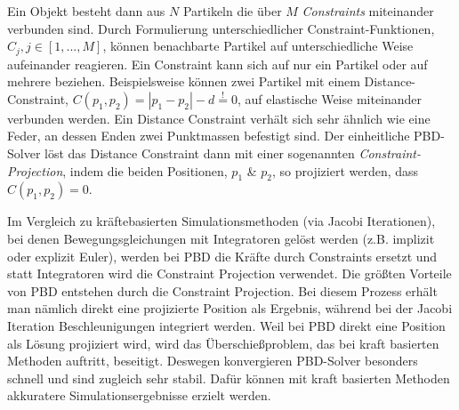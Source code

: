 Ein Objekt besteht dann aus $N$ Partikeln die über $M$ \textit{Constraints} miteinander verbunden sind. Durch Formulierung unterschiedlicher Constraint-Funktionen, $C_j, j \in [1,...,M] $, können benachbarte Partikel auf unterschiedliche Weise aufeinander reagieren. Ein Constraint kann sich auf nur ein Partikel oder auf mehrere beziehen.
Beispielsweise können zwei Partikel mit einem Distance-Constraint, $C(p_1,p_2) = |p_1-p_2|-d \stackrel{!}{=} 0$, auf elastische Weise miteinander verbunden werden. Ein Distance Constraint verhält sich sehr ähnlich wie eine Feder, an dessen Enden zwei Punktmassen befestigt sind. Der einheitliche PBD-Solver löst das Distance Constraint dann mit einer sogenannten \textit{Constraint-Projection}, indem die beiden Positionen, $p_1$ \& $p_2$, so projiziert werden, dass $C(p_1,p_2) = 0$. 

Im Vergleich zu kräftebasierten Simulationsmethoden (via Jacobi Iterationen), bei denen Bewegungsgleichungen mit Integratoren gelöst werden (z.B. implizit oder explizit Euler), werden bei PBD die Kräfte durch Constraints ersetzt und statt Integratoren wird die Constraint Projection verwendet. Die größten Vorteile von PBD entstehen durch die Constraint Projection. Bei diesem Prozess erhält man nämlich direkt eine projizierte Position als Ergebnis, während bei der Jacobi Iteration Beschleunigungen integriert werden. 
Weil bei PBD direkt eine Position als Lösung projiziert wird,
wird das Überschießproblem, das bei kraft basierten Methoden auftritt, beseitigt. Deswegen konvergieren PBD-Solver besonders schnell und sind zugleich sehr stabil. 
Dafür können mit kraft basierten Methoden akkuratere Simulationsergebnisse erzielt werden.


